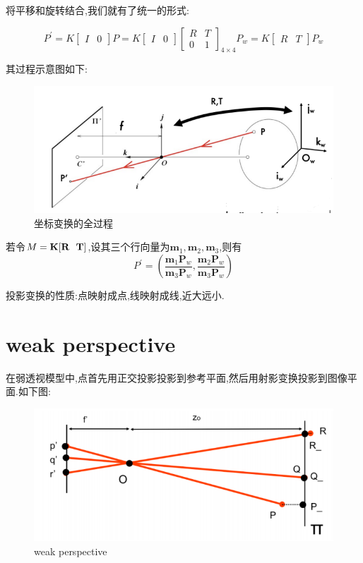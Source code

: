 将平移和旋转结合,我们就有了统一的形式:

\begin{equation}
	P^{\prime}=K\left[\begin{array}{ll}
		I & 0
	\end{array}\right] P=K\left[\begin{array}{ll}
		I & 0
	\end{array}\right]\left[\begin{array}{ll}
		R & T \\
		0 & 1
	\end{array}\right]_{4 \times 4} P_{w}=K\left[\begin{array}{ll}
		R & T
	\end{array}\right] P_{w}
\end{equation}

其过程示意图如下:

\begin{figure}[htbp]
	\centering
	\includegraphics[scale=0.75]{figures/transform_all.png}
	\caption{坐标变换的全过程}
\end{figure}

若令$M = \bold{K}[\bold{R} \ \ \bold{T}]$,设其三个行向量为$\bm m_1, \bm m_2, \bm m_3$,则有
\begin{equation}
	P^\prime = \left(\frac{\bm{m}_{1} \bm P_{w}}{\bm{m}_{3} \bm P_{w}}, \frac{\bm{m}_{2} \bm P_{w}}{\bm{m}_{3} \bm P_{w}}\right)
\end{equation}

投影变换的性质:点映射成点,线映射成线,近大远小.

\section{weak perspective}

在弱透视模型中,点首先用正交投影投影到参考平面,然后用射影变换投影到图像平面.如下图:

\begin{figure}[htbp]
	\centering
	\includegraphics[scale=0.8]{figures/weak_perspective.png}
	\caption{weak perspective}
\end{figure}

